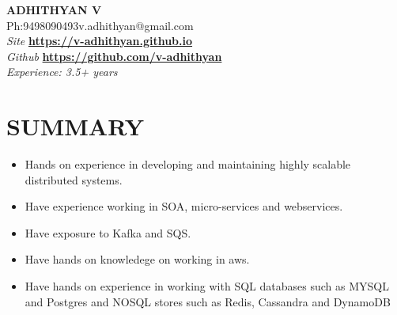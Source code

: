 \documentclass[11pt,a4paper]{article}
\begin{document}
\begin{center}
{\LARGE{\textbf{ADHITHYAN V}}}\\
{Ph:9498090493\hfill}{\hfill v.adhithyan@gmail.com} \\
\emph{Site} \textbf{\href{https://v-adhithyan.github.io}{https://v-adhithyan.github.io}} \\
\emph{Github} \textbf{\href{https://github.com/v-adhithyan}{https://github.com/v-adhithyan}}\\
\emph{Experience: 3.5+ years}
\noindent\makebox[\linewidth]{\rule{\paperwidth}{0.4pt}}
\end{center}
\section*{SUMMARY}
\begin{itemize}[noitemsep]
\item Hands on experience in developing and maintaining highly scalable distributed systems.
\item Have experience working in SOA, micro-services and webservices.
\item Have exposure to Kafka and SQS.
\item Have hands on knowledege on working in aws.
\item Have hands on experience in working with SQL databases such as MYSQL and Postgres and NOSQL stores such as Redis, Cassandra and DynamoDB
\end{itemize}
\end{document}
